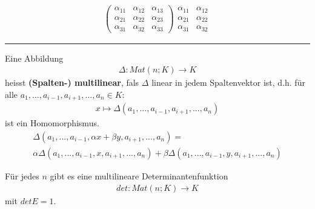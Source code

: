 \documentclass[11pt]{report}
\newcommand*\f[1] {\textbf{#1}}
\begin{document}
\begin{itemize}
\begin{align}
\begin{pmatrix} \alpha_{11} & \alpha_{12} & \alpha_{13} \\ \alpha_{21} & \alpha_{22} & \alpha_{23} \\ \alpha_{31} & \alpha_{32} & \alpha_{33}\end{pmatrix} \begin{matrix} \alpha_{11} & \alpha_{12} \\ \alpha_{21} & \alpha_{22} \\ \alpha_{31} & \alpha_{32} \end{matrix}
\end{align}
\end{itemize}
\vspace*{0.2cm}\rule{\linewidth}{0.3mm}\vspace{0.2cm}
Eine Abbildung
\begin{align}
\Delta: Mat(n;K) \rightarrow K
\end{align}
heisst \f{(Spalten-) multilinear}, fals $\Delta$ linear in jedem Spaltenvektor ist, d.h. für alle $a_1, ..., a_{i-1}, a_{i+1}, ..., a_n \in K$:
\begin{align}
x \mapsto \Delta(a_1, ..., a_{i-1}, a_{i+1}, ..., a_n)
\end{align}
ist ein Homomorphismus.
\begin{align}
\Delta(a_1, ..., a_{i-1}, \alpha x + \beta y, a_{i+1}, ..., a_n) = \\ 
\alpha \Delta(a_1, ..., a_{i-1}, x, a_{i+1}, ..., a_n) + \beta \Delta(a_1, ..., a_{i-1}, y, a_{i+1}, ..., a_n)
\end{align}

\begin{satz}
\label{satz613}
Für jedes $n$ gibt es eine multilineare Determinantenfunktion
\begin{align}
det: Mat(n;K) \rightarrow K
\end{align}
mit $det E = 1$.
\end{satz}
\end{document}
